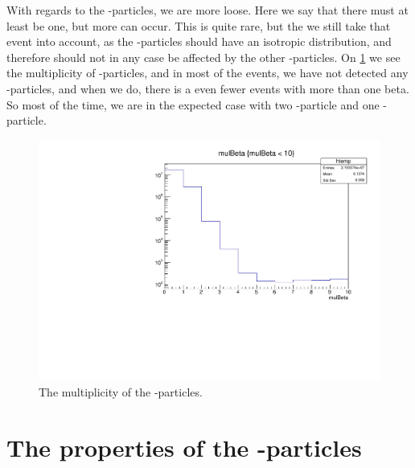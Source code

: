 With regards to the \be-particles, we are more loose. Here we say that there must at least be one, but more can occur. This is quite rare, but the we still take that event into account, as the \be-particles should have an isotropic distribution, and therefore should not in any case be affected by the other \al-particles. On \cref{fig:mulBeta} we see the multiplicity of \be-particles, and in most of the events, we have not detected any \be-particles, and when we do, there is a even fewer events with more than one beta. So most of the time, we are in the expected case with two \al-particle and one \be-particle. 

\begin{figure}[h]
	\includegraphics[width=\linewidth]{../figures/mulBeta.pdf}
	\caption{The multiplicity of the \be-particles.}
	\label{fig:mulBeta}
\end{figure}

\section{The properties of the \al-particles}


